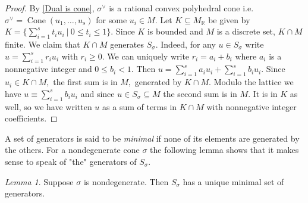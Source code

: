 \documentclass[BSc]{usydthesis}
\numberwithin{equation}{chapter}
\theoremstyle{remark}
\newtheorem{Lemma}[equation]{Lemma}
\newcommand{\R}{\mathbb{R}}
\newcommand{\V}{\vee}
\DeclareMathOperator{\Cone}{Cone}
\begin{document}
\begin{proof}
By \ref{Dual is cone}, $\sigma^{\V}$ is a rational convex polyhedral cone i.e. $\sigma^{\V} = \Cone(u_1,\ldots, u_s)$ for some $u_i\in M.$ Let $K\subseteq M_{\R}$ be given by $\displaystyle K=\biggr\{ \sum_{i=1}^s t_i u_i \ \bigg| \ 0\leq t_i \leq 1 \biggr\}.$ Since $K$ is bounded and $M$ is a discrete set, $K\cap M$ finite. We claim that $K\cap M$ generates $S_{\sigma}.$ Indeed, for any $u\in S_{\sigma}$ write $u=\displaystyle\sum_{i=1}^s r_i u_i$ with $r_i\geq 0.$ We can uniquely write $r_i = a_i + b_i$ where $a_i$ is a nonnegative integer and $0\leq b_i <1.$ Then $\displaystyle u = \sum_{i=1}^s a_i u_i + \sum_{i=1}^s b_i u_i.$ Since $u_i\in K\cap M,$ the first sum is in $M,$ generated by $K\cap M.$ Modulo the lattice we have $u \equiv \displaystyle \sum_{i=1}^s b_i u_i$ and since $u\in S_{\sigma} \subseteq M$ the second sum is in $M.$ It is in $K$ as well, so we have written $u$ as a sum of terms in $K\cap M$ with nonnegative integer coefficients. 
\end{proof}

A set of generators is said to be {\em minimal} if none of its elements are generated by the others. For a nondegenerate cone $\sigma$ the following lemma shows that it makes sense to speak of "the" generators of $S_{\sigma}.$

\begin{Lemma}\label{Minimal}
 Suppose $\sigma$ is nondegenerate. Then $S_{\sigma}$ has a unique minimal set of generators.
\end{Lemma}
\end{document}
